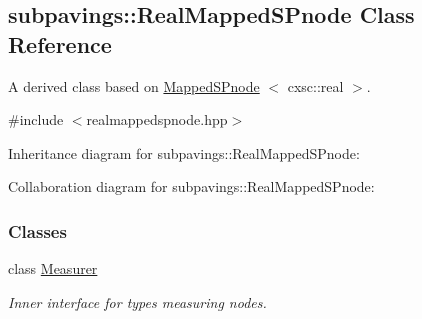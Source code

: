 \hypertarget{classsubpavings_1_1RealMappedSPnode}{\subsection{subpavings\-:\-:\-Real\-Mapped\-S\-Pnode \-Class \-Reference}
\label{classsubpavings_1_1RealMappedSPnode}
}


\-A derived class based on \hyperlink{classsubpavings_1_1MappedSPnode}{\-Mapped\-S\-Pnode} $<$ cxsc\-::real $>$.  




{\ttfamily \#include $<$realmappedspnode.\-hpp$>$}



\-Inheritance diagram for subpavings\-:\-:\-Real\-Mapped\-S\-Pnode\-:


\-Collaboration diagram for subpavings\-:\-:\-Real\-Mapped\-S\-Pnode\-:
\subsubsection*{\-Classes}
\begin{DoxyCompactItemize}
\item 
class \hyperlink{classsubpavings_1_1RealMappedSPnode_1_1Measurer}{\-Measurer}
\begin{DoxyCompactList}\small\item\em \-Inner interface for types measuring nodes. \end{DoxyCompactList}\end{DoxyCompactItemize}
